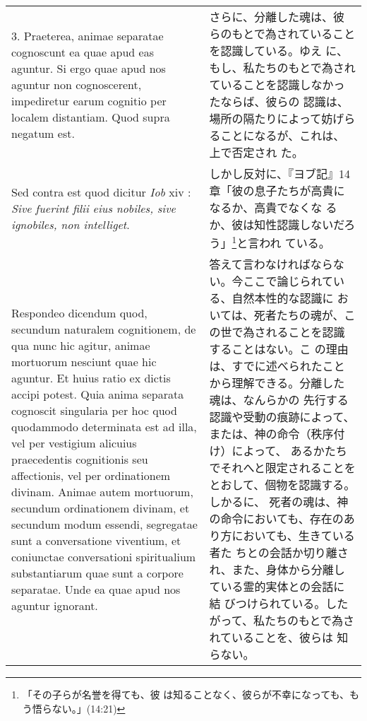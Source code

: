 \documentclass[10pt]{jsarticle} %
\begin{document}
\begin{longtable}{p{21em}p{21em}}
\\




3. {\sc Praeterea}, animae separatae cognoscunt ea quae apud eas
aguntur. Si ergo quae apud nos aguntur non cognoscerent, impediretur
earum cognitio per localem distantiam. Quod supra negatum est.

&


さらに、分離した魂は、彼らのもとで為されていることを認識している。ゆえ
に、もし、私たちのもとで為されていることを認識しなかったならば、彼らの
認識は、場所の隔たりによって妨げらることになるが、これは、上で否定され
た。

\\




{\sc Sed contra est} quod dicitur {\it Iob} {\sc xiv} : {\it Sive
fuerint filii eius nobiles, sive ignobiles, non intelliget}.

&


しかし反対に、『ヨブ記』14章「彼の息子たちが高貴になるか、高貴でなくな
るか、彼は知性認識しないだろう」\footnote{「その子らが名誉を得ても、彼
は知ることなく、彼らが不幸になっても、もう悟らない。」(14:21)}と言われ
ている。


\\


{\sc Respondeo dicendum} quod, secundum naturalem cognitionem, de qua
nunc hic agitur, animae mortuorum nesciunt quae hic aguntur. Et huius
ratio ex dictis accipi potest. Quia anima separata cognoscit
singularia per hoc quod quodammodo determinata est ad illa, vel per
vestigium alicuius praecedentis cognitionis seu affectionis, vel per
ordinationem divinam. Animae autem mortuorum, secundum ordinationem
divinam, et secundum modum essendi, segregatae sunt a conversatione
viventium, et coniunctae conversationi spiritualium substantiarum quae
sunt a corpore separatae. Unde ea quae apud nos aguntur ignorant.

&


答えて言わなければならない。今ここで論じられている、自然本性的な認識に
おいては、死者たちの魂が、この世で為されることを認識することはない。こ
の理由は、すでに述べられたことから理解できる。分離した魂は、なんらかの
先行する認識や受動の痕跡によって、または、神の命令（秩序付け）によって、
あるかたちでそれへと限定されることをとおして、個物を認識する。しかるに、
死者の魂は、神の命令においても、存在のあり方においても、生きている者た
ちとの会話か切り離され、また、身体から分離している霊的実体との会話に結
びつけられている。したがって、私たちのもとで為されていることを、彼らは
知らない。



\end{longtable}
\end{document}
